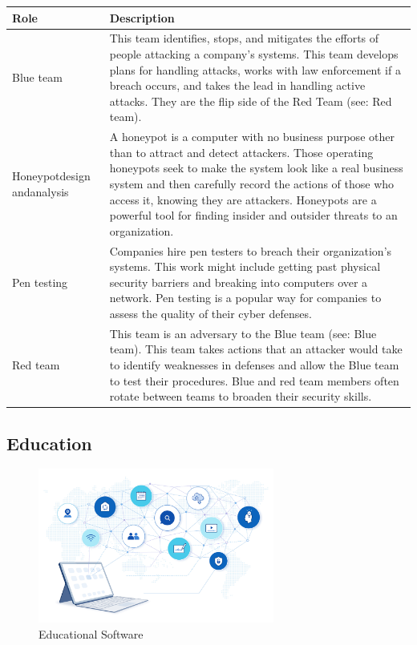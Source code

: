 \begin{table}[H]
	\begin{center}
		\begin{tabular}{p{1in}|p{3.4in}} 
			\textbf{Role} & \textbf{Description}\\
			\hline
			Blue team & This team identifies, stops, and mitigates the efforts of people attacking a company's systems. This team develops plans for handling attacks, works with law enforcement if a breach occurs, and takes the lead in handling active attacks. They are the flip side of the Red Team (see: Red team).\\
			\hline
			Honeypot\linebreak design and\linebreak analysis & A honeypot is a computer with no business purpose other than to attract and detect attackers. Those operating honeypots seek to make the system look like a real business system and then carefully record the actions of those who access it, knowing they are attackers. Honeypots are a powerful tool for finding insider and outsider threats to an organization.\\
			\hline
			Pen testing & Companies hire pen testers to breach their organization's systems. This work might include getting past physical security barriers and breaking into computers over a network. Pen testing is a popular way for companies to assess the quality of their cyber defenses.\\
			\hline
			Red team & This team is an adversary to the Blue team (see: Blue team). This team takes actions that an attacker would take to identify weaknesses in defenses and allow the Blue team to test their procedures. Blue and red team members often rotate between teams to broaden their security skills.\\
			\hline
		\end{tabular}
	\end{center}
\end{table}


\subsection{Education}

\begin{figure}[H]
	\begin{center}
		\caption{Educational Software}
		\vskip 4pt
		\includegraphics[height=2in]{images/careers/iStock-1360633055.small.jpg}
	\end{center}
\end{figure}

